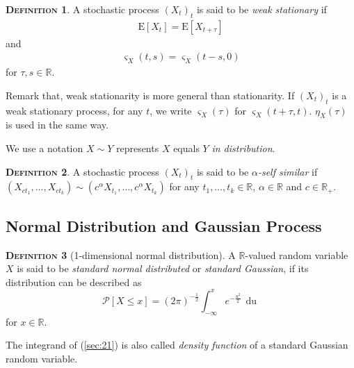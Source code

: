 \documentclass[a4paper, twoside, 11pt]{article}
\theoremstyle{definition}
\newtheorem{definition}{\scshape Definition}[section]
\newcommand{\sqbr}[1]{\left[ {#1} \right]}
\begin{document}
  \begin{definition}
	A stochastic process $(X_t)_t$ is said to be \emph{weak stationary} if 
	\begin{eqnarray*}
	  \mathrm{E}[X_t] = \mathrm{E}[X_{t+\tau}]
	\end{eqnarray*}
	and 
	\begin{eqnarray*}
	  \varsigma_{X}(t, s) = \varsigma_{X}(t-s, 0)
	\end{eqnarray*}
	for $\tau, s \in \mathbb{R}$.
  \end{definition}
  Remark that, weak stationarity is more general than stationarity. If $(X_t)_t$ is a weak stationary process, for any $t$, we write $\varsigma_X(\tau)$ for $\varsigma_X(t+\tau, t)$. $\eta_X(\tau)$ is used in the same way. 


  We use a notation $X \sim Y$ represents $X$ equals $Y$ \emph{in distribution}. 
  \begin{definition}
	A stochastic process $(X_t)_{t}$ is said to be \emph{$\alpha$-self similar} if $(X_{ct_1},\dots,X_{ct_k}) \sim (c^\alpha X_{t_1},\dots, c^\alpha X_{t_k})$ for any $t_1,\dots, t_k \in \mathbb{R}$, $\alpha\in\mathbb{R}$ and $c\in \mathbb{R}_{+}$.
  \end{definition}

  \subsection{Normal Distribution and Gaussian Process}
  \begin{definition}[1-dimensional normal distribution]
	A $\mathbb{R}$-valued random variable $X$ is said to be \emph{standard normal distributed} or \emph{standard Gaussian}, if its distribution can be described as
	\begin{equation}
	  \mathcal{P}\sqbr{X \le x} = (2\pi)^{-\frac{1}{2}}\int_{-\infty}^{x} e^{-\frac{u^2}{2}}\,\mathop{du}  
	  \label{sec:21}
	\end{equation}
	for $x \in \mathbb{R}$.
  \end{definition}
  The integrand of (\ref{sec:21}) is also called \emph{density function} of a standard Gaussian random variable.
\end{document}

